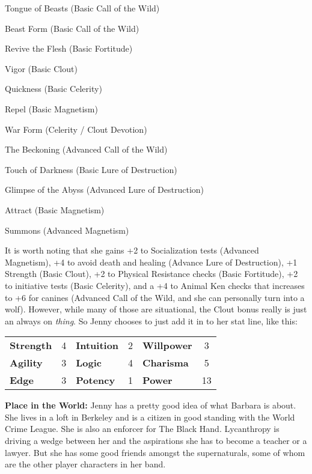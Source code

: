 \begin{itemize*}
\item Tongue of Beasts (Basic Call of the Wild)
\item Beast Form (Basic Call of the Wild)
\item Revive the Flesh (Basic Fortitude) 
\item Vigor (Basic Clout) 
\item Quickness (Basic Celerity) 
\item Repel (Basic Magnetism) 
\item War Form (Celerity / Clout Devotion) 
\item The Beckoning (Advanced Call of the Wild)
\item Touch of Darkness (Basic Lure of Destruction)
\item Glimpse of the Abyss (Advanced Lure of Destruction)
\item Attract (Basic Magnetism)
\item Summons (Advanced Magnetism)
\end{itemize*}

It is worth noting that she gains +2 to Socialization tests (Advanced Magnetism), +4 to avoid death and healing (Advance Lure of Destruction), +1 Strength (Basic Clout), +2 to Physical Resistance checks (Basic Fortitude), +2 to initiative tests (Basic Celerity), and a +4 to Animal Ken checks that increases to +6 for canines (Advanced Call of the Wild, and she can personally turn into a wolf). However, while many of those are situational, the Clout bonus really is just an always on \textit{thing}. So Jenny chooses to just add it in to her stat line, like this:

\medskip
\begin{tabular}{lc lc lc}
\textbf{Strength} & 4 & \textbf{Intuition} & 2 & \textbf{Willpower} & 3\\
\textbf{Agility} & 3 & \textbf{Logic} & 4 & \textbf{Charisma} & 5\\
\textbf{Edge} & 3 & \textbf{Potency} & 1 & \textbf{Power} & 13\\
\end{tabular}
\medskip

\textbf{Place in the World:} Jenny has a pretty good idea of what Barbara is about. She lives in a loft in Berkeley and is a citizen in good standing with the World Crime League. She is also an enforcer for The Black Hand. Lycanthropy is driving a wedge between her and the aspirations she has to become a teacher or a lawyer. But she has some good friends amongst the supernaturals, some of whom are the other player characters in her band.
